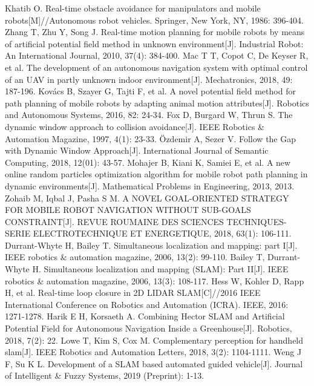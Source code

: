 \documentclass{iosart2c}
\begin{document}
\begin{thebibliography}{0}
Khatib O. Real-time obstacle avoidance for manipulators and mobile robots[M]//Autonomous robot vehicles. Springer, New York, NY, 1986: 396-404.
Zhang T, Zhu Y, Song J. Real-time motion planning for mobile robots by means of artificial potential field method in unknown environment[J]. Industrial Robot: An International Journal, 2010, 37(4): 384-400.
Mac T T, Copot C, De Keyser R, et al. The development of an autonomous navigation system with optimal control of an UAV in partly unknown indoor environment[J]. Mechatronics, 2018, 49: 187-196.
Kovács B, Szayer G, Tajti F, et al. A novel potential field method for path planning of mobile robots by adapting animal motion attributes[J]. Robotics and Autonomous Systems, 2016, 82: 24-34.
Fox D, Burgard W, Thrun S. The dynamic window approach to collision avoidance[J]. IEEE Robotics \& Automation Magazine, 1997, 4(1): 23-33.
Özdemir A, Sezer V. Follow the Gap with Dynamic Window Approach[J]. International Journal of Semantic Computing, 2018, 12(01): 43-57.
Mohajer B, Kiani K, Samiei E, et al. A new online random particles optimization algorithm for mobile robot path planning in dynamic environments[J]. Mathematical Problems in Engineering, 2013, 2013.
Zohaib M, Iqbal J, Pasha S M. A NOVEL GOAL-ORIENTED STRATEGY FOR MOBILE ROBOT NAVIGATION WITHOUT SUB-GOALS CONSTRAINT[J]. REVUE ROUMAINE DES SCIENCES TECHNIQUES-SERIE ELECTROTECHNIQUE ET ENERGETIQUE, 2018, 63(1): 106-111.
Durrant-Whyte H, Bailey T. Simultaneous localization and mapping: part I[J]. IEEE robotics \& automation magazine, 2006, 13(2): 99-110.
Bailey T, Durrant-Whyte H. Simultaneous localization and mapping (SLAM): Part II[J]. IEEE robotics \& automation magazine, 2006, 13(3): 108-117.
Hess W, Kohler D, Rapp H, et al. Real-time loop closure in 2D LIDAR SLAM[C]//2016 IEEE International Conference on Robotics and Automation (ICRA). IEEE, 2016: 1271-1278.
Harik E H, Korsaeth A. Combining Hector SLAM and Artificial Potential Field for Autonomous Navigation Inside a Greenhouse[J]. Robotics, 2018, 7(2): 22.
Lowe T, Kim S, Cox M. Complementary perception for handheld slam[J]. IEEE Robotics and Automation Letters, 2018, 3(2): 1104-1111.
Weng J F, Su K L. Development of a SLAM based automated guided vehicle[J]. Journal of Intelligent \& Fuzzy Systems, 2019 (Preprint): 1-13.

\end{thebibliography}
\end{document}
